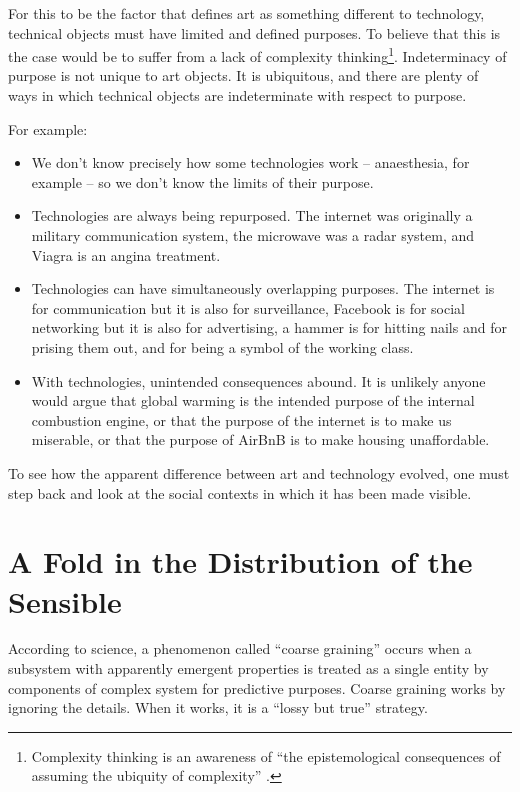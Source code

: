\documentclass[letter:wpaper]{article}
\begin{document}
    For this to be the factor that defines art as something different to technology, technical objects must have limited and defined purposes. To believe that this is the case would be to suffer from a lack of complexity thinking\footnote{
        Complexity thinking is an awareness of ``the epistemological consequences of assuming the ubiquity of complexity'' \citep{CilliersRichardsonCmplxtyScnc2001}.
    }. Indeterminacy of purpose is not unique to art objects. It is ubiquitous, and there are plenty of ways in which technical objects are indeterminate with respect to purpose.
    
    For example:

    \begin{itemize}
        \item We don't know precisely how some technologies work – anaesthesia, for example – so we don't know the limits of their purpose.
        \item Technologies are always being repurposed. The internet was originally a military communication system, the microwave was a radar system, and Viagra is an angina treatment.
        \item Technologies can have simultaneously overlapping purposes. The internet is for communication but it is also for surveillance, Facebook is for social networking but it is also for advertising, a hammer is for hitting nails and for prising them out, and for being a symbol of the working class.
        \item With technologies, unintended consequences abound. It is unlikely anyone would argue that global warming is the intended purpose of the internal combustion engine, or that the purpose of the internet is to make us miserable, or that the purpose of AirBnB is to make housing unaffordable.
    \end{itemize}

    To see how the apparent difference between art and technology evolved, one must step back and look at the social contexts in which it has been made visible.

\section{A Fold in the Distribution of the Sensible}
    
    According to science, a phenomenon called ``coarse graining'' occurs when a subsystem with apparently emergent properties is treated as a single entity by components of complex system for predictive purposes. Coarse graining works by ignoring the details. When it works, it is a ``lossy but true'' \citep[p.4]{FlackCrsGrnng2017} strategy.
\end{document}
